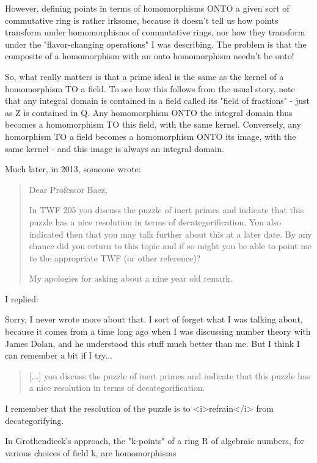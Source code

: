 However, defining points in terms of homomorphisms ONTO a given 
sort of commutative ring is rather irksome, because it doesn't 
tell us how points transform under homomorphisms of commutative 
rings, nor how they transform under the "flavor-changing operations" 
I was describing.  The problem is that the composite of a homomorphism 
with an onto homomorphism needn't be onto!

So, what really matters is that a prime ideal is the same as the 
kernel of a homomorphism TO a field.  To see how this follows from 
the usual story, note that any integral domain is contained in a 
field called its "field of fractions" - just as Z is contained in Q.  
Any homomorphism ONTO the integral domain thus becomes a homomorphism 
TO this field, with the same kernel.  Conversely, any homorphism TO 
a field becomes a homomorphism ONTO its image, with the same kernel - 
and this image is always an integral domain.

Much later, in 2013, someone wrote:

\begin{quote}
Dear Professor Baez,

In TWF 205 you discuss the puzzle of inert primes and indicate that
this puzzle has a nice resolution in terms of decategorification.  You
also indicated then that you may talk further about this at a later
date.  By any chance did you return to this topic and if so might you
be able to point me to the appropriate TWF (or other reference)?

My apologies for asking about a nine year old remark.
\end{quote}

I replied:

Sorry, I never wrote more about that.  I sort of forget what I was
talking about, because it comes from a time long ago when I was
discussing number theory with James Dolan, and he understood this
stuff much better than me.  But I think I can remember a bit if I
try...

\begin{quote} [...] you discuss the puzzle of inert primes and indicate
that this puzzle has a nice resolution in terms of decategorification.
\end{quote}
 
I remember that the resolution of the puzzle is to <i>refrain</i> from
decategorifying.

In Grothendieck's approach, the "k-points" of a ring R of algebraic
numbers, for various choices of field k, are homomorphisms


